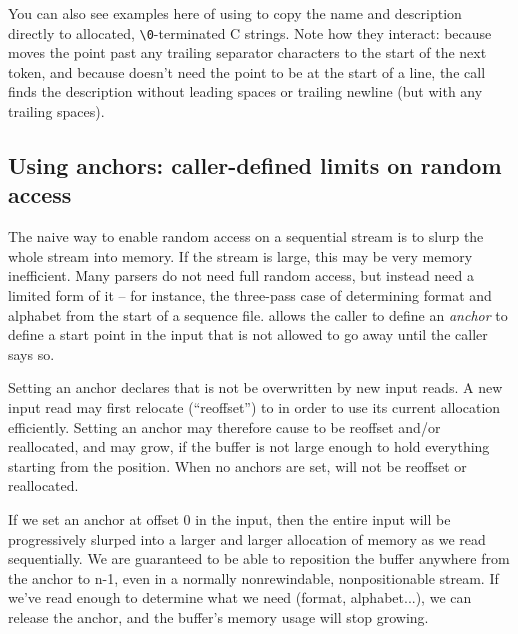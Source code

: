 You can also see examples here of using
 to copy the name and description
directly to allocated, \verb+\0+-terminated C strings. Note how they
interact: because  moves the
point past any trailing separator characters to the start of the next
token, and because  doesn't need
the point to be at the start of a line, the
 call finds the description
without leading spaces or trailing newline (but with any trailing
spaces).












      





\subsection{Using anchors: caller-defined limits on random access}

The naive way to enable random access on a sequential stream is to
slurp the whole stream into memory. If the stream is large, this may
be very memory inefficient. Many parsers do not need full random
access, but instead need a limited form of it -- for instance, the
three-pass case of determining format and alphabet from the start of a
sequence file.  allows the caller to define an
\emph{anchor} to define a start point in the input that is not allowed
to go away until the caller says so. 

Setting an anchor declares that  is not be
overwritten by new input reads. A new input read may first relocate
(``reoffset'')  to 
in order to use its current allocation efficiently. Setting an anchor
may therefore cause  to be reoffset and/or reallocated, and
 may grow, if the buffer is not large enough to hold
everything starting from the  position. When no anchors
are set,  will not be reoffset or reallocated.

If we set an anchor at offset 0 in the input, then the entire input
will be progressively slurped into a larger and larger allocation of
memory as we read sequentially. We are guaranteed to be able to
reposition the buffer anywhere from the anchor to n-1, even in a
normally nonrewindable, nonpositionable stream. If we've read enough
to determine what we need (format, alphabet...), we can release the
anchor, and the buffer's memory usage will stop growing.

